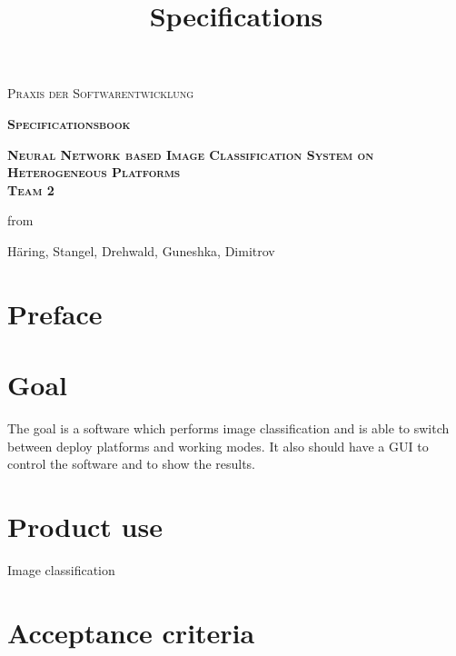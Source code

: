 \documentclass[parskip=full]{scrartcl}
\title{Specifications}
\author{}
\begin{document}
\begin{titlepage}
\centering
	\vspace{3cm}
	{\scshape\LARGE Praxis der Softwarentwicklung\par}
	\vspace{2cm}
	{\scshape\Huge\bfseries Specificationsbook \par}	
	\vspace{2cm}
	{\scshape\Huge\bfseries Neural Network based Image Classification System on Heterogeneous Platforms \\ Team 2 \par}
	\vspace{2cm}
	{\Large from \par}
	\vspace{0.25cm}
	{\Large Häring, Stangel, Drehwald, Guneshka, Dimitrov \par}
	\vfill
\end{titlepage}
\newpage
\tableofcontents
\newpage
\section{Preface}

\section{Goal}
The goal is a software which performs image classification and is able to switch between deploy platforms and working modes.
It also should have a GUI to control the software and to show the results.

\section{Product use}
Image classification

\section{Acceptance criteria}
\end{document}
